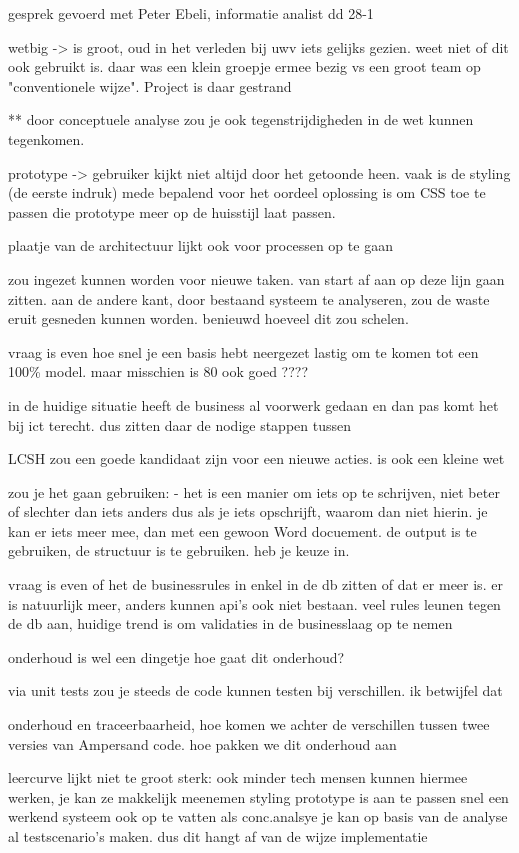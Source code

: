 gesprek gevoerd met Peter Ebeli, informatie analist
dd 28-1

wetbig -> is groot, oud
in het verleden bij uwv iets gelijks gezien. weet niet of dit ook gebruikt is.
daar was een klein groepje ermee bezig vs een groot team op "conventionele wijze". Project is daar gestrand

** door conceptuele analyse zou je ook tegenstrijdigheden in de wet kunnen tegenkomen.

prototype -> gebruiker kijkt niet altijd door het getoonde heen. vaak is de styling (de eerste indruk)  mede bepalend voor het oordeel
oplossing is om CSS toe te passen die prototype meer op de huisstijl laat passen.

plaatje van de architectuur lijkt ook voor processen op te gaan

zou ingezet kunnen worden voor nieuwe taken. van start af aan op deze lijn gaan zitten.
aan de andere kant, door bestaand systeem te analyseren, zou de waste eruit gesneden kunnen worden. 
benieuwd hoeveel dit zou schelen.

vraag is even hoe snel je een basis hebt neergezet
lastig om te komen tot een 100\% model. maar misschien is 80 ook goed ????

in de huidige situatie heeft de business al voorwerk gedaan en dan pas komt het bij ict terecht. dus zitten daar de nodige stappen tussen

LCSH zou een goede kandidaat zijn voor een nieuwe acties. is ook een kleine wet

zou je het gaan gebruiken:
- het is een manier om iets op te schrijven, niet beter of slechter dan iets anders
dus als je iets opschrijft, waarom dan niet hierin.
je kan er iets meer mee, dan met een gewoon Word docuement.
de output is te gebruiken, de structuur is te gebruiken. heb je keuze in.

vraag is even of het de businessrules in enkel in de db zitten of dat er meer is. 
er is natuurlijk meer, anders kunnen api's ook niet bestaan.
veel rules leunen tegen de db aan, huidige trend is om validaties in de businesslaag op te nemen

onderhoud is wel een dingetje
hoe gaat dit onderhoud?

via unit tests zou je steeds de code kunnen testen bij verschillen. ik betwijfel dat

onderhoud en traceerbaarheid, hoe komen we achter de verschillen tussen twee versies van Ampersand code.
hoe pakken we dit onderhoud aan

leercurve lijkt niet te groot
sterk: ook minder tech mensen kunnen hiermee werken, je kan ze makkelijk meenemen
styling prototype is aan te passen
snel een werkend systeem
ook op te vatten als conc.analsye
je kan op basis van de analyse al testscenario's maken. dus dit hangt af van de wijze implementatie

